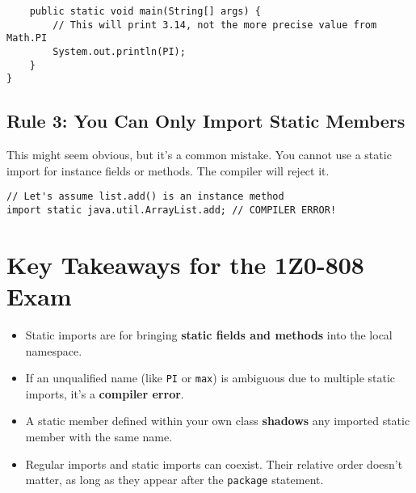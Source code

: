 \documentclass[12pt]{article}
\begin{document}
\begin{enumerate}[label=(\arabic*)]
\begin{verbatim}
    public static void main(String[] args) {
        // This will print 3.14, not the more precise value from Math.PI
        System.out.println(PI);
    }
}
\end{verbatim}

\subsection{Rule 3: You Can Only Import Static Members}
This might seem obvious, but it's a common mistake. You cannot use a static import for instance fields or methods. The compiler will reject it.
\begin{verbatim}
// Let's assume list.add() is an instance method
import static java.util.ArrayList.add; // COMPILER ERROR!
\end{verbatim}

\section*{Key Takeaways for the 1Z0-808 Exam}
\begin{itemize}
    \item Static imports are for bringing \textbf{static fields and methods} into the local namespace.
    \item If an unqualified name (like \texttt{PI} or \texttt{max}) is ambiguous due to multiple static imports, it's a \textbf{compiler error}.
    \item A static member defined within your own class \textbf{shadows} any imported static member with the same name.
    \item Regular imports and static imports can coexist. Their relative order doesn't matter, as long as they appear after the \texttt{package} statement.
\end{itemize}
\end{enumerate}
\end{document}
